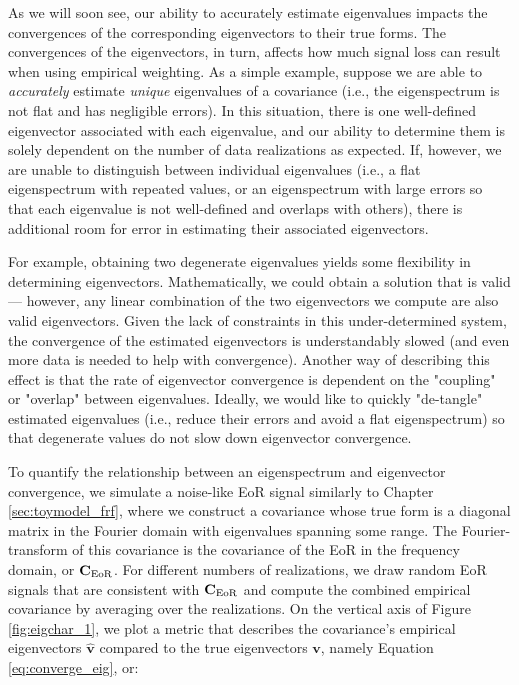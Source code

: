 As we will soon see, our ability to accurately estimate eigenvalues impacts the convergences of the corresponding eigenvectors to their true forms. The convergences of the eigenvectors, in turn, affects how much signal loss can result when using empirical weighting. As a simple example, suppose we are able to \textit{accurately} estimate \textit{unique} eigenvalues of a covariance (i.e., the eigenspectrum is not flat and has negligible errors). In this situation, there is one well-defined eigenvector associated with each eigenvalue, and our ability to determine them is solely dependent on the number of data realizations as expected. If, however, we are unable to distinguish between individual eigenvalues (i.e., a flat eigenspectrum with repeated values, or an eigenspectrum with large errors so that each eigenvalue is not well-defined and overlaps with others), there is additional room for error in estimating their associated eigenvectors. 

For example, obtaining two degenerate eigenvalues yields some flexibility in determining eigenvectors. Mathematically, we could obtain a solution that is valid --- however, any linear combination of the two eigenvectors we compute are also valid eigenvectors. Given the lack of constraints in this under-determined system, the convergence of the estimated eigenvectors is understandably slowed (and even more data is needed to help with convergence). Another way of describing this effect is that the rate of eigenvector convergence is dependent on the "coupling" or "overlap" between eigenvalues. Ideally, we would like to quickly "de-tangle" estimated eigenvalues (i.e., reduce their errors and avoid a flat eigenspectrum) so that degenerate values do not slow down eigenvector convergence.

To quantify the relationship between an eigenspectrum and eigenvector convergence, we simulate a noise-like EoR signal similarly to Chapter \ref{sec:toymodel_frf}, where we construct a covariance whose true form is a diagonal matrix in the Fourier domain with eigenvalues spanning some range. The Fourier-transform of this covariance is the covariance of the EoR in the frequency domain, or $\textbf{C}_{\rm EoR}$. For different numbers of realizations, we draw random EoR signals that are consistent with $\textbf{C}_{\rm EoR}$ and compute the combined empirical covariance by averaging over the realizations. On the vertical axis of Figure \ref{fig:eigchar_1}, we plot a metric that describes the covariance's empirical eigenvectors $\widehat{\textbf{v}}$ compared to the true eigenvectors $\textbf{v}$, namely Equation \eqref{eq:converge_eig}, or:

